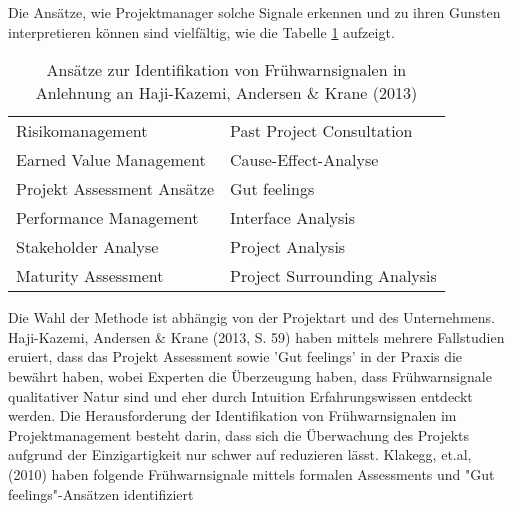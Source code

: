 \newline
Die Ansätze, wie Projektmanager solche Signale erkennen und zu ihren Gunsten interpretieren können sind vielfältig, wie die Tabelle \ref{tab:Ans} aufzeigt.
\begin{table}[H]
	\centering
	\caption{Ansätze zur Identifikation von Frühwarnsignalen
		\newline in Anlehnung an Haji-Kazemi, Andersen \& Krane (2013)}\label{tab:Ans}	
	\begin{tabular}{l|l}
		Risikomanagement & Past Project Consultation\\
		Earned Value Management & Cause-Effect-Analyse\\
		Projekt Assessment Ansätze & Gut feelings \\
		Performance Management & Interface Analysis\\
		Stakeholder Analyse & Project Analysis \\
		Maturity Assessment & Project Surrounding Analysis\\
	\end{tabular}		
\end{table}
Die Wahl der Methode ist abhängig von der Projektart und des Unternehmens. Haji-Kazemi, Andersen \& Krane (2013, S. 59) haben mittels mehrere Fallstudien eruiert, dass das Projekt Assessment sowie 'Gut feelings' in der Praxis die bewährt haben, wobei Experten die Überzeugung haben, dass Frühwarnsignale qualitativer Natur sind und eher durch Intuition Erfahrungswissen entdeckt werden. Die Herausforderung  der Identifikation von Frühwarnsignalen im Projektmanagement besteht darin, dass sich die Überwachung des Projekts aufgrund der Einzigartigkeit nur schwer auf reduzieren lässt. Klakegg, et.al, (2010) haben folgende Frühwarnsignale mittels formalen Assessments und "Gut feelings"-Ansätzen identifiziert


